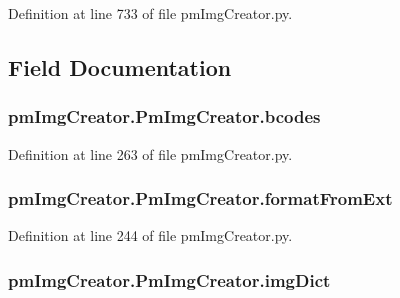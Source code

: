 Definition at line 733 of file pm\-Img\-Creator.\-py.



\subsection{Field Documentation}
\hypertarget{classpm_img_creator_1_1_pm_img_creator_a2024e87cbf388b462a13c9734ee76927}{
\subsubsection[{bcodes}]{\setlength{\rightskip}{0pt plus 5cm}pm\-Img\-Creator.\-Pm\-Img\-Creator.\-bcodes}}\label{classpm_img_creator_1_1_pm_img_creator_a2024e87cbf388b462a13c9734ee76927}


Definition at line 263 of file pm\-Img\-Creator.\-py.

\hypertarget{classpm_img_creator_1_1_pm_img_creator_a82fce01e7ade132aebf4cfdc273ddec0}{
\subsubsection[{format\-From\-Ext}]{\setlength{\rightskip}{0pt plus 5cm}pm\-Img\-Creator.\-Pm\-Img\-Creator.\-format\-From\-Ext}}\label{classpm_img_creator_1_1_pm_img_creator_a82fce01e7ade132aebf4cfdc273ddec0}


Definition at line 244 of file pm\-Img\-Creator.\-py.

\hypertarget{classpm_img_creator_1_1_pm_img_creator_a4f00474bb6c13f0b49a6c0b977b59858}{
\subsubsection[{img\-Dict}]{\setlength{\rightskip}{0pt plus 5cm}pm\-Img\-Creator.\-Pm\-Img\-Creator.\-img\-Dict}}\label{classpm_img_creator_1_1_pm_img_creator_a4f00474bb6c13f0b49a6c0b977b59858}


